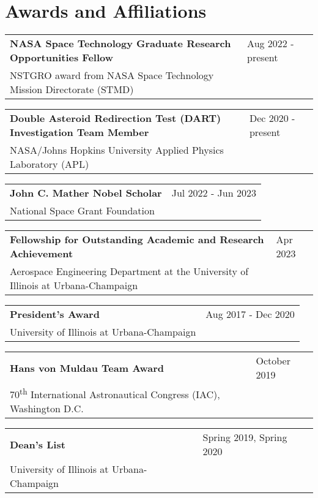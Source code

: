 \documentclass[letterpaper,12pt]{article}
\begin{document}
\section{Awards and Affiliations}
\begin{tabularx}{\linewidth}{@{}l X@{}}
\textbf{NASA Space Technology Graduate Research Opportunities Fellow} & \hfill Aug 2022 - present \\[3.75pt]
NSTGRO award from NASA Space Technology Mission Directorate (STMD) & \hfill \\[3.75pt]
\end{tabularx}
\begin{tabularx}{\linewidth}{@{}l X@{}}
\textbf{Double Asteroid Redirection Test (DART) Investigation Team Member} & \hfill Dec 2020 - present \\[3.75pt]
NASA/Johns Hopkins University Applied Physics Laboratory (APL) & \hfill \\[3.75pt]
\end{tabularx}
\begin{tabularx}{\linewidth}{@{}l X@{}}
\textbf{John C. Mather Nobel Scholar} & \hfill Jul 2022 - Jun 2023 \\[3.75pt]
National Space Grant Foundation & \hfill \\[3.75pt]
\end{tabularx}
\begin{tabularx}{\linewidth}{@{}l X@{}}
\textbf{Fellowship for Outstanding Academic and Research Achievement} & \hfill Apr 2023 \\[3.75pt]
Aerospace Engineering Department at the University of Illinois at Urbana-Champaign & \hfill \\[3.75pt]
\end{tabularx}
\begin{tabularx}{\linewidth}{@{}l X@{}}
\textbf{President's Award} & \hfill Aug 2017 - Dec 2020 \\[3.75pt]
University of Illinois at Urbana-Champaign & \hfill \\[3.75pt]
\end{tabularx}
\begin{tabularx}{\linewidth}{@{}l X@{}}
\textbf{Hans von Muldau Team Award} & \hfill October 2019 \\[3.75pt]
70\textsuperscript{th} International Astronautical Congress (IAC), Washington D.C. & \hfill \\[3.75pt]
\end{tabularx}
\begin{tabularx}{\linewidth}{@{}l X@{}}
\textbf{Dean's List} & \hfill Spring 2019, Spring 2020 \\[3.75pt]
University of Illinois at Urbana-Champaign & \hfill \\[3.75pt]
\end{tabularx}
\end{document}
